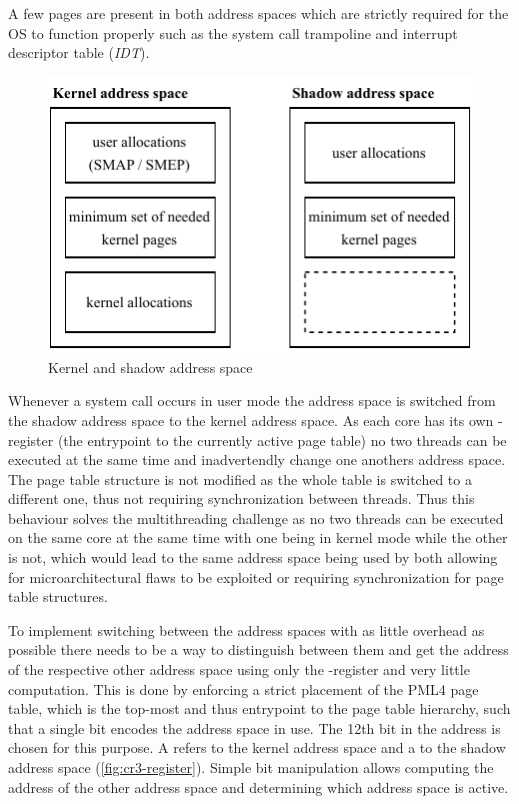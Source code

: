 A few pages are present in both address spaces which are strictly required for the OS to function properly such as the system call trampoline and interrupt descriptor table (\textit{IDT}).

\begin{figure}[h]
  \begin{center}
    \includegraphics[page=1,width=.4\textwidth]{fig/prebuilt_shadow_address_space}
  \end{center}
  \caption{Kernel and shadow address space}
  \label{fig:shadow_address_space}
\end{figure}

Whenever a system call occurs in user mode the address space is switched from the shadow address space to the kernel address space.
As each core has its own -register (the entrypoint to the currently active page table) no two threads can be executed at the same time and inadvertendly change one anothers address space.
The page table structure is not modified as the whole table is switched to a different one, thus not requiring synchronization between threads.
Thus this behaviour solves the multithreading challenge as no two threads can be executed on the same core at the same time with one being in kernel mode while the other is not, which would lead to the same address space being used by both allowing for microarchitectural flaws to be exploited or requiring synchronization for page table structures.

To implement switching between the address spaces with as little overhead as possible there needs to be a way to distinguish between them and get the address of the respective other address space using only the -register and very little computation.
This is done by enforcing a strict placement of the PML4 page table, which is the top-most and thus entrypoint to the page table hierarchy, such that a single bit encodes the address space in use.
The 12th bit in the address is chosen for this purpose.
A  refers to the kernel address space and a  to the shadow address space (\autoref{fig:cr3-register}).
Simple bit manipulation allows computing the address of the other address space and determining which address space is active.

